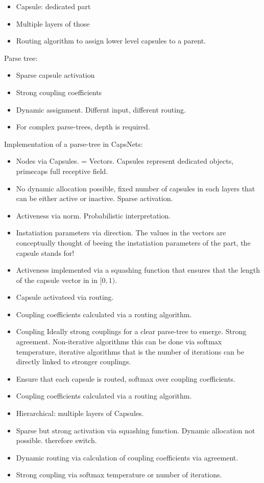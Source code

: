 \documentclass{article}
\begin{document}
\begin{itemize}
	\item Capsule: dedicated part
	\item Multiple layers of those
	\item Routing algorithm to assign lower level capsules to a parent.
\end{itemize}

Parse tree:
\begin{itemize}
	\item Sparse capsule activation
	\item Strong coupling coefficients
	\item Dynamic assignment. Differnt input, different routing.
	\item For complex parse-trees, depth is required.
\end{itemize}

Implementation of a parse-tree in CapsNets:
\begin{itemize}
	\item Nodes via Capsules. = Vectors. Capsules represent dedicated objects, primecaps full receptive field.
	\item No dynamic allocation possible, fixed number of capsules in each layers that can be either active or inactive. Sparse activation.
	\item Activeness via norm. Probabilistic interpretation.
	\item Instatiation parameters via direction. The values in the vectors are conceptually thought of beeing the instatiation parameters of the part, the capsule stands for!
	\item Activeness implemented via a squashing function that ensures that the length of the capsule vector in in $[0,1)$.
	\item Capsule activateed via routing.
	\item Coupling coefficients calculated via a routing algorithm.
	\item Coupling Ideally strong couplings for a clear parse-tree to emerge. Strong agreement. Non-iterative algorithms this can be done via softmax temperature, iterative algorithms that is the number of iterations can be directly linked to stronger couplings.
	\item Ensure that each capsule is routed, softmax over coupling coefficients.
	\item Coupling coefficients calculated via a routing algorithm.
	\item Hierarchical: multiple layers of Capsules.
	\item Sparse but strong activation via squashing function. Dynamic allocation not possible. therefore switch.
	\item Dynamic routing via calculation of coupling coefficients via agreement.
	\item Strong coupling via softmax temperature or number of iterations.
\end{itemize}
\end{document}
